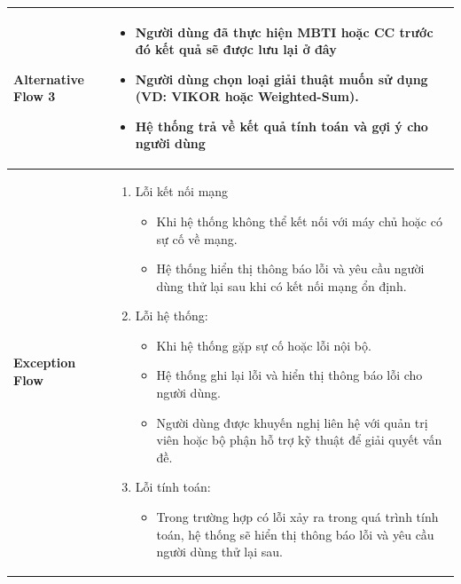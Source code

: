 \begin{longtable}[H]{|l|p{}|}
        \textbf{Alternative Flow 3} &  \vspace{-0.75cm} \begin{itemize}[leftmargin=4mm]
            \setlength\itemsep{0em}
            \item Người dùng đã thực hiện MBTI hoặc CC trước đó kết quả sẽ được lưu lại ở đây
            \item Người dùng chọn loại giải thuật muốn sử dụng (VD: VIKOR hoặc Weighted-Sum). 
            \item Hệ thống trả về kết quả tính toán và gợi ý cho người dùng
        \end{itemize} \\
        \hline
        \textbf{Exception Flow} &  \vspace{-0.75cm} \begin{enumerate}[leftmargin=5.5mm]
            \setlength\itemsep{0em}
            \item Lỗi kết nối mạng
                \begin{itemize}
                    \setlength\itemsep{0em}
                    \item Khi hệ thống không thể kết nối với máy chủ hoặc có sự cố về mạng.
                    \item Hệ thống hiển thị thông báo lỗi và yêu cầu người dùng thử lại sau khi có kết nối mạng ổn định.
                \end{itemize}
            \item Lỗi hệ thống:
                \begin{itemize}
                    \setlength\itemsep{0em}
                    \item Khi hệ thống gặp sự cố hoặc lỗi nội bộ.
                    \item Hệ thống ghi lại lỗi và hiển thị thông báo lỗi cho người dùng.
                    \item Người dùng được khuyến nghị liên hệ với quản trị viên hoặc bộ phận hỗ trợ kỹ thuật để giải quyết vấn đề.
                \end{itemize}
            \item Lỗi tính toán: 
                \begin{itemize}
                    \setlength\itemsep{0em}
                    \item Trong trường hợp có lỗi xảy ra trong quá trình tính toán, hệ thống sẽ hiển thị thông báo lỗi và yêu cầu người dùng thử lại sau.
                \end{itemize}
        \end{enumerate}\\
        \hline
    \end{longtable}


